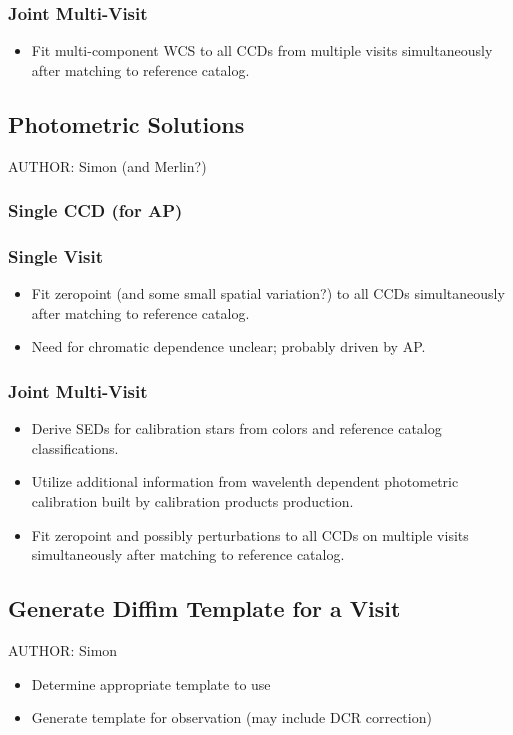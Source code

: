 \subsubsection{Joint Multi-Visit}
\begin{itemize}
\item Fit multi-component WCS to all CCDs from multiple visits simultaneously after matching to reference catalog.
\end{itemize}

\subsection{Photometric Solutions}
AUTHOR: Simon (and Merlin?)
\subsubsection{Single CCD (for AP)}
\subsubsection{Single Visit}
\begin{itemize}
\item Fit zeropoint (and some small spatial variation?) to all CCDs simultaneously after matching to reference catalog.
\item Need for chromatic dependence unclear; probably driven by AP.
\end{itemize}
\subsubsection{Joint Multi-Visit}
\begin{itemize}
\item Derive SEDs for calibration stars from colors and reference catalog classifications.
\item Utilize additional information from wavelenth dependent photometric calibration built by calibration products production.
\item Fit zeropoint and possibly perturbations to all CCDs on multiple visits simultaneously after matching to reference catalog.
\end{itemize}

\subsection{Generate Diffim Template for a Visit}
AUTHOR: Simon
\begin{itemize}
\item Determine appropriate template to use
\item Generate template for observation (may include DCR correction)
\end{itemize}

